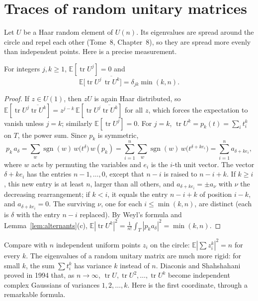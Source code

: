 \section{Traces of random unitary matrices}

Let $U$ be a Haar random element of $U(n)$. Its eigenvalues are spread around the circle and repel each other (Tome~8, Chapter~8), so they are spread more evenly than independent points. Here is a precise measurement.

\begin{proposition}\label{prop:powertraces}
For integers $j,k\ge1$, $\mathbb E[\operatorname{tr}U^j]=0$ and
\[
\mathbb E\bigl[\operatorname{tr}U^j\,\overline{\operatorname{tr}U^k}\bigr]=\delta_{jk}\min(k,n).
\]
\end{proposition}

\begin{proof}
If $z\in U(1)$, then $zU$ is again Haar distributed, so $\mathbb E[\operatorname{tr}U^j\overline{\operatorname{tr}U^k}]=z^{j-k}\,\mathbb E[\operatorname{tr}U^j\overline{\operatorname{tr}U^k}]$ for all $z$, which forces the expectation to vanish unless $j=k$; similarly $\mathbb E[\operatorname{tr}U^j]=0$.
For $j=k$, $\operatorname{tr}U^k=p_k(t)=\sum_it_i^k$ on $T$, the power sum. Since $p_k$ is symmetric,
\[
p_k\,a_\delta=\sum_{w}\operatorname{sgn}(w)\,w\bigl(t^\delta\bigr)\,w(p_k)=\sum_{i=1}^n\sum_w\operatorname{sgn}(w)\,w\bigl(t^{\delta+ke_i}\bigr)=\sum_{i=1}^na_{\delta+ke_i},
\]
where $w$ acts by permuting the variables and $e_i$ is the $i$-th unit vector. The vector $\delta+ke_i$ has the entries $n-1,\dots,0$, except that $n-i$ is raised to $n-i+k$. If $k\ge i$, this new entry is at least $n$, larger than all others, and
$a_{\delta+ke_i}=\pm a_\nu$ with $\nu$ the decreasing rearrangement; if $k<i$, it equals the entry $n-i+k$ of position $i-k$, and $a_{\delta+ke_i}=0$. The surviving $\nu$, one for each $i\le\min(k,n)$, are distinct (each is $\delta$ with the entry $n-i$ replaced). By
Weyl's formula and Lemma~\ref{lem:alternants}(c), $\mathbb E|\operatorname{tr}U^k|^2=\frac1{n!}\int_T|p_ka_\delta|^2=\min(k,n)$.
\end{proof}

Compare with $n$ independent uniform points $z_i$ on the circle: $\mathbb E|\sum z_i^k|^2=n$ for every $k$. The eigenvalues of a random unitary matrix are much more rigid: for small $k$, the sum $\sum t_i^k$ has variance $k$ instead of $n$. Diaconis and Shahshahani
proved in 1994 that, as $n\to\infty$, $\operatorname{tr}U,\operatorname{tr}U^2,\dots,\operatorname{tr}U^k$ become independent complex Gaussians of variances $1,2,\dots,k$. Here is the first coordinate, through a remarkable formula.

